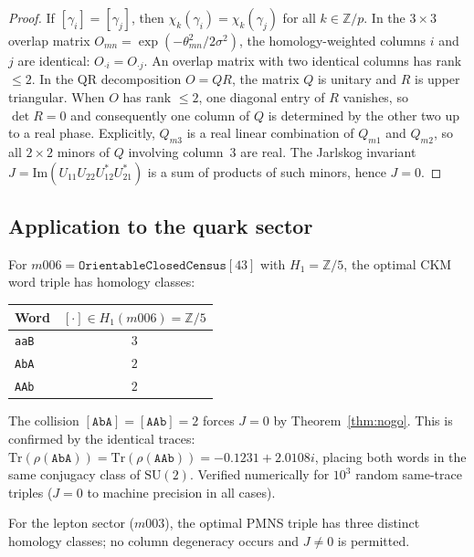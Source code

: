 \documentclass[12pt]{article}
\theoremstyle{definition}
\begin{document}
\begin{proof}
If $[\gamma_i] = [\gamma_j]$, then
$\chi_k(\gamma_i) = \chi_k(\gamma_j)$ for all $k \in \mathbb{Z}/p$.
In the $3\times 3$ overlap matrix $O_{mn} =
\exp(-\theta_{mn}^2/2\sigma^2)$, the homology-weighted columns
$i$ and $j$ are identical: $O_{\cdot i} = O_{\cdot j}$.
An overlap matrix with two identical columns has rank $\leq 2$.
In the QR decomposition $O = QR$, the matrix $Q$ is unitary
and $R$ is upper triangular. When $O$ has rank $\leq 2$, one
diagonal entry of $R$ vanishes, so $\det R = 0$ and consequently
one column of $Q$ is determined by the other two up to a real
phase. Explicitly, $Q_{m3}$ is a real linear combination of
$Q_{m1}$ and $Q_{m2}$, so all $2\times 2$ minors of $Q$ involving
column~3 are real. The Jarlskog invariant
$J = \mathrm{Im}(U_{11}U_{22}U_{12}^*U_{21}^*)$
is a sum of products of such minors, hence $J = 0$.
\end{proof}

\subsection{Application to the quark sector}

For $m006 = \texttt{OrientableClosedCensus}[43]$ with $H_1 =
\mathbb{Z}/5$, the optimal CKM word triple has homology classes:

\begin{center}
\begin{tabular}{lc}
\toprule
Word & $[\cdot] \in H_1(m006) = \mathbb{Z}/5$ \\
\midrule
\texttt{aaB} & $3$ \\
\texttt{AbA} & $2$ \\
\texttt{AAb} & $2$ \\
\bottomrule
\end{tabular}
\end{center}

The collision $[\texttt{AbA}] = [\texttt{AAb}] = 2$ forces $J = 0$
by Theorem~\ref{thm:nogo}. This is confirmed by the identical
traces: $\mathrm{Tr}(\rho(\texttt{AbA})) =
\mathrm{Tr}(\rho(\texttt{AAb})) = -0.1231 + 2.0108i$, placing
both words in the same conjugacy class of $\mathrm{SU}(2)$.
Verified numerically for $10^3$ random same-trace triples
($J = 0$ to machine precision in all cases).

For the lepton sector ($m003$), the optimal PMNS triple has three
distinct homology classes; no column degeneracy occurs and
$J \neq 0$ is permitted.
\end{document}

